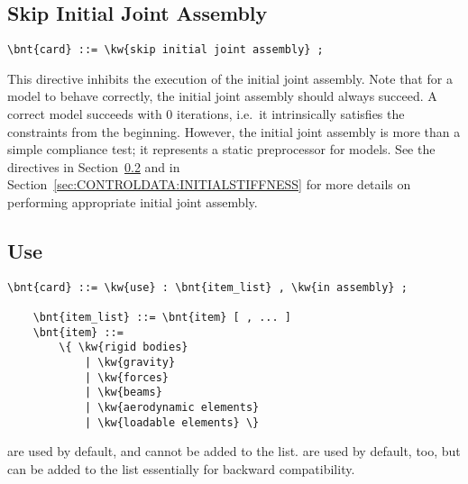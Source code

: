 \subsection{Skip Initial Joint Assembly}
\begin{Verbatim}[commandchars=\\\{\}]
    \bnt{card} ::= \kw{skip initial joint assembly} ;
\end{Verbatim}
This directive inhibits the execution of the initial joint assembly.
Note that for a model to behave correctly, the initial joint assembly
should always succeed.
A correct model succeeds with 0 iterations, i.e.\ it intrinsically 
satisfies the constraints from the beginning.
However, the initial joint assembly is more than a simple compliance
test; it represents a static preprocessor for models.
See the directives  in Section~\ref{sec:CONTROLDATA:USE}
and  in Section~\ref{sec:CONTROLDATA:INITIALSTIFFNESS}
for more details on performing appropriate initial joint assembly.



\subsection{Use}\label{sec:CONTROLDATA:USE}
\begin{Verbatim}[commandchars=\\\{\}]
    \bnt{card} ::= \kw{use} : \bnt{item_list} , \kw{in assembly} ;

    \bnt{item_list} ::= \bnt{item} [ , ... ]
    \bnt{item} ::=
        \{ \kw{rigid bodies}
            | \kw{gravity}
            | \kw{forces}
            | \kw{beams}
            | \kw{aerodynamic elements}
            | \kw{loadable elements} \} 
\end{Verbatim}
 are used by default, and cannot be added to the list.
 are used by default, too, but can be added to the list
essentially for backward compatibility.

